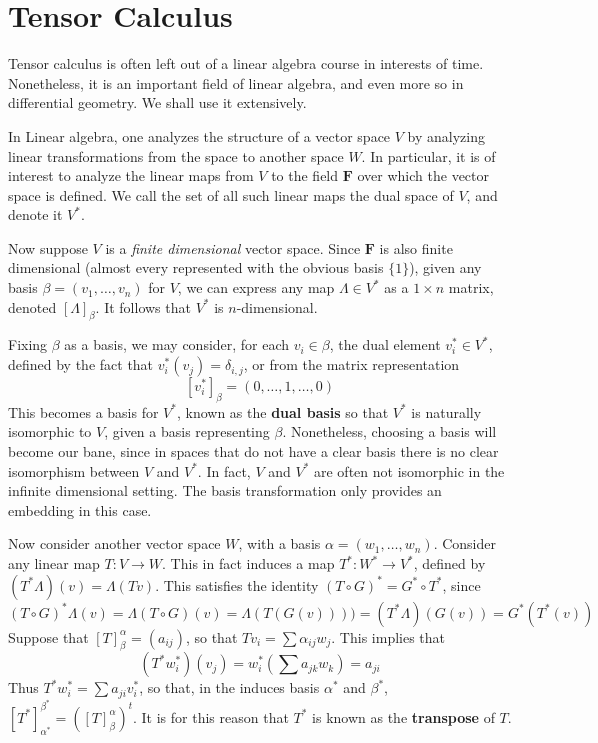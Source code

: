 \chapter{Tensor Calculus}

Tensor calculus is often left out of a linear algebra course in interests of time. Nonetheless, it is an important field of linear algebra, and even more so in differential geometry. We shall use it extensively.

In Linear algebra, one analyzes the structure of a vector space $V$ by analyzing linear transformations from the space to another space $W$. In particular, it is of interest to analyze the linear maps from $V$ to the field $\mathbf{F}$ over which the vector space is defined. We call the set of all such linear maps the dual space of $V$, and denote it $V^*$.

Now suppose $V$ is a {\it finite dimensional} vector space. Since $\mathbf{F}$ is also finite dimensional (almost every represented with the obvious basis $\{ 1 \}$), given any basis $\beta = (v_1, \dots, v_n)$ for $V$, we can express any map $\Lambda \in V^*$ as a $1 \times n$ matrix, denoted $[\Lambda]_{\beta}$. It follows that $V^*$ is $n$-dimensional.

Fixing $\beta$ as a basis, we may consider, for each $v_i \in \beta$, the dual element $v_i^* \in V^*$, defined by the fact that $v_i^*(v_j) = \delta_{i,j}$, or from the matrix representation
%
\[ [v_i^*]_\beta = (0, \dots, 1, \dots, 0) \]
%
This becomes a basis for $V^*$, known as the {\bf dual basis} so that $V^*$ is naturally isomorphic to $V$, given a basis representing $\beta$. Nonetheless, choosing a basis will become our bane, since in spaces that do not have a clear basis there is no clear isomorphism between $V$ and $V^*$. In fact, $V$ and $V^*$ are often not isomorphic in the infinite dimensional setting. The basis transformation only provides an embedding in this case.

Now consider another vector space $W$, with a basis $\alpha = (w_1, \dots, w_n)$. Consider any linear map $T:V \to W$. This in fact induces a map $T^*:W^* \to V^*$, defined by $(T^*\Lambda)(v) = \Lambda(Tv)$. This satisfies the identity $(T \circ G)^* = G^* \circ T^*$, since
%
\[ (T \circ G)^*\Lambda(v) = \Lambda(T \circ G)(v) = \Lambda(T(G(v)))) = (T^*\Lambda)(G(v)) = G^*(T^*(v)) \]
%
Suppose that $[T]_\beta^\alpha = (a_{ij})$, so that $Tv_i = \sum \alpha_{ij} w_j$. This implies that
%
\[ (T^*w_i^*)(v_j) = w_i^*(\sum a_{jk} w_k) = a_{ji} \]
%
Thus $T^*w_i^* = \sum a_{ji} v_i^*$, so that, in the induces basis $\alpha^*$ and $\beta^*$, $[T^*]_{\alpha^*}^{\beta^*} = ([T]_\beta^\alpha)^t$. It is for this reason that $T^*$ is known as the {\bf transpose} of $T$.

